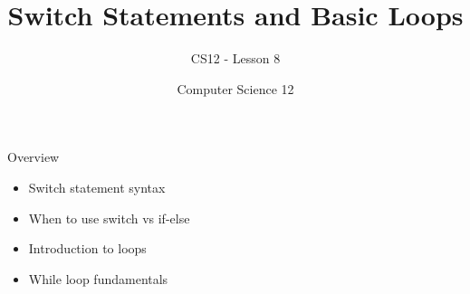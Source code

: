 \documentclass[10pt]{beamer}
\title{Switch Statements and Basic Loops}
\subtitle{CS12 - Lesson 8}
\author{Computer Science 12}
\date{}
\begin{document}
\begin{frame}
    \titlepage
\end{frame}

\begin{frame}{Overview}
    \begin{itemize}
        \item Switch statement syntax
        \item When to use switch vs if-else
        \item Introduction to loops
        \item While loop fundamentals
    \end{itemize}
\end{frame}

\end{document}
